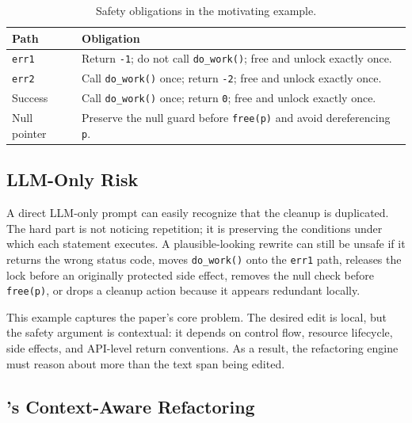 \begin{table}[t]
  \centering
  \caption{Safety obligations in the motivating example.}
  \label{tab:motivating-invariants}
  \footnotesize
  \begin{tabularx}{\columnwidth}{@{}>{\raggedright\arraybackslash}p{}>{\raggedright\arraybackslash}X@{}}
    \toprule
    \textbf{Path} & \textbf{Obligation} \\
    \midrule
    \texttt{err1} &
    Return \texttt{-1}; do not call \texttt{do\_work()}; free and unlock exactly once. \\
    \texttt{err2} &
    Call \texttt{do\_work()} once; return \texttt{-2}; free and unlock exactly once. \\
    Success &
    Call \texttt{do\_work()} once; return \texttt{0}; free and unlock exactly once. \\
    Null pointer &
    Preserve the null guard before \texttt{free(p)} and avoid dereferencing \texttt{p}. \\
    \bottomrule
  \end{tabularx}
\end{table}

\subsection{LLM-Only Risk}
\label{sec:motivation-risk}

A direct LLM-only prompt can easily recognize that the cleanup is duplicated.
The hard part is not noticing repetition; it is preserving the conditions under
which each statement executes. A plausible-looking rewrite can still be unsafe
if it returns the wrong status code, moves \texttt{do\_work()} onto the
\texttt{err1} path, releases the lock before an originally protected side
effect, removes the null check before \texttt{free(p)}, or drops a cleanup action
because it appears redundant locally.

This example captures the paper's core problem. The desired edit is local, but
the safety argument is contextual: it depends on control flow, resource
lifecycle, side effects, and API-level return conventions. As a result, the
refactoring engine must reason about more than the text span being edited.

\subsection{\SysName{}'s Context-Aware Refactoring}
\label{sec:motivation-care}

